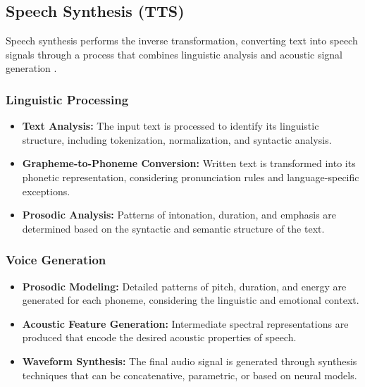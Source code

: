 \subsection{Speech Synthesis (TTS)}

Speech synthesis performs the inverse transformation, converting text into speech signals through a process that combines linguistic analysis and acoustic signal generation \cite{taylor2009text}.


\subsubsection{Linguistic Processing}

\begin{itemize}
  \item \textbf{Text Analysis:} The input text is processed to identify its linguistic structure, including tokenization, normalization, and syntactic analysis.

  \item \textbf{Grapheme-to-Phoneme Conversion:} Written text is transformed into its phonetic representation, considering pronunciation rules and language-specific exceptions.

  \item \textbf{Prosodic Analysis:} Patterns of intonation, duration, and emphasis are determined based on the syntactic and semantic structure of the text.
\end{itemize}

\subsubsection{Voice Generation}

\begin{itemize}
  \item \textbf{Prosodic Modeling:} Detailed patterns of pitch, duration, and energy are generated for each phoneme, considering the linguistic and emotional context.

  \item \textbf{Acoustic Feature Generation:} Intermediate spectral representations are produced that encode the desired acoustic properties of speech.

  \item \textbf{Waveform Synthesis:} The final audio signal is generated through synthesis techniques that can be concatenative, parametric, or based on neural models.
\end{itemize}

